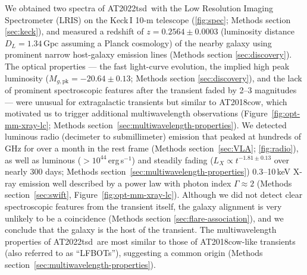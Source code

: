 \documentclass{nature_plusfigure}
\newcommand{\at}{AT2022tsd}
\begin{document}
We obtained two spectra of \at\ with the Low Resolution Imaging Spectrometer (LRIS) on the Keck\,I 10-m telescope (\ref{fig:spec}; Methods section \ref{sec:keck}), and measured\cite{Ho2022_Astronote_Keck} a redshift of $z=0.2564\pm0.0003$ (luminosity distance $D_L=1.34\,$Gpc assuming a Planck cosmology\cite{Planck2020}) of the nearby galaxy using prominent narrow host-galaxy emission lines (Methods section \ref{sec:discovery}). 
The optical properties --- the fast light-curve evolution, the implied high peak luminosity ($M_{g,\mathrm{pk}}=-20.64\pm0.13$; Methods section \ref{sec:discovery}), and the lack of prominent spectroscopic features after the transient faded by 2--3 magnitudes --- were unusual for extragalactic transients but similar to AT2018cow, which motivated us to trigger additional multiwavelength observations (Figure~\ref{fig:opt-mm-xray-lc}; Methods section~\ref{sec:multiwavelength-properties}).
We detected luminous radio (decimeter\cite{Ho2022Astronote_radio} to submillimeter) emission that peaked at hundreds of GHz for over a month in the rest frame (Methods section~\ref{sec:VLA}; \ref{fig:radio}),
as well as luminous ($>10^{44}\,$erg\,s$^{-1}$) and steadily fading ($L_X\propto t^{-1.81\pm0.13}$ over nearly 300 days; Methods section~\ref{sec:multiwavelength-properties}) 0.3--10\,keV X-ray emission\cite{Schulze2022Astronote_xray} well described by a power law with photon index $\Gamma\approx2$ (Methods section~\ref{sec:swift}, Figure~\ref{fig:opt-mm-xray-lc}).
Although we did not detect clear spectroscopic features from the transient itself, the galaxy alignment is very unlikely to be a coincidence (Methods section \ref{sec:flare-association}), and we conclude that the galaxy is the host of the transient.
The multiwavelength properties of \at\ are most similar to those of AT2018cow-like transients (also referred to as ``LFBOTs''\cite{Metzger2022}), suggesting a common origin (Methods section~\ref{sec:multiwavelength-properties}).
\end{document}
